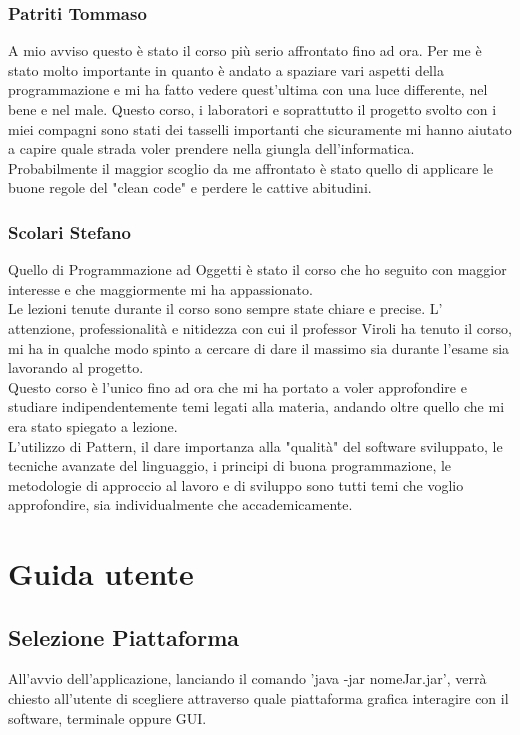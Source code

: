 \documentclass[a4paper,12pt]{report}
\begin{document}
\subsection{Patriti Tommaso}
A mio avviso questo è stato il corso più serio affrontato fino ad ora. Per me è stato molto importante in quanto è andato a spaziare vari aspetti della programmazione e mi ha fatto vedere quest'ultima con una luce differente, nel bene e nel male. Questo corso, i laboratori e soprattutto il progetto svolto con i miei compagni sono stati dei tasselli importanti che sicuramente mi hanno aiutato a capire quale strada voler prendere nella giungla dell'informatica.
\\
Probabilmente il maggior scoglio da me affrontato è stato quello di applicare le buone regole del "clean code" e perdere le cattive abitudini.  


\subsection{Scolari Stefano}
Quello di Programmazione ad Oggetti è stato il corso che ho seguito con maggior interesse e che maggiormente mi ha appassionato.
\\
Le lezioni tenute durante il corso sono sempre state chiare e precise. L' attenzione, professionalità e nitidezza con cui il professor Viroli ha tenuto il corso, mi ha in qualche modo spinto a cercare di dare il massimo sia durante l'esame sia lavorando al progetto.
\\
Questo corso è l'unico fino ad ora che mi ha portato a voler approfondire e studiare indipendentemente temi legati alla materia, andando oltre quello che mi era stato spiegato a lezione.
\\
L'utilizzo di Pattern, il dare importanza alla "qualità" del software sviluppato, le tecniche avanzate del linguaggio, i principi di buona programmazione, le metodologie di approccio al lavoro e di sviluppo sono tutti temi che voglio approfondire, sia individualmente che accademicamente.


\appendix

\chapter{Guida utente}

\section{Selezione Piattaforma}
All'avvio dell'applicazione, lanciando il comando 'java -jar nomeJar.jar', verrà chiesto all'utente di scegliere attraverso quale piattaforma grafica interagire con il software, terminale oppure GUI.
\end{document}
